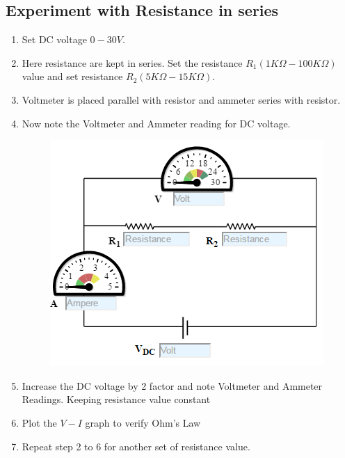 		\subsection{Experiment with Resistance in series}				
			\begin{enumerate}
				\tightlist
				\item
				Set DC voltage $0-30 V$.
				\item
				Here resistance are kept in series. Set the resistance $R_1 (1 K\Omega - 100
				K\Omega)$ value and set resistance $R_2 (5K\Omega - 15K\Omega)$.
				\item
				Voltmeter is placed parallel with resistor and ammeter series with
				resistor.
				\item
				Now note the Voltmeter and Ammeter reading for DC voltage.
				\begin{figure}[h]
					\centering
					\includegraphics[width=0.4\linewidth]{img/exp4/6}
					\caption{}
					\label{fig:exp4_2}
				\end{figure}
				\item
				Increase the DC voltage by 2 factor and note Voltmeter and Ammeter
				Readings. Keeping resistance value constant
				\item
				Plot the $V-I$ graph to verify Ohm's Law
				\item
				Repeat step 2 to 6 for another set of resistance value.
			\end{enumerate}
		
